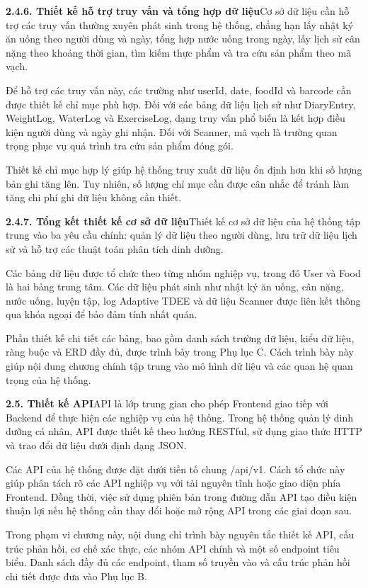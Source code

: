 \textbf{2.4.6. Thiết kế hỗ trợ truy vấn và tổng hợp dữ liệu}Cơ sở dữ liệu cần hỗ trợ các truy vấn thường xuyên phát sinh trong hệ thống, chẳng hạn lấy nhật ký ăn uống theo người dùng và ngày, tổng hợp nước uống trong ngày, lấy lịch sử cân nặng theo khoảng thời gian, tìm kiếm thực phẩm và tra cứu sản phẩm theo mã vạch.

Để hỗ trợ các truy vấn này, các trường như userId, date, foodId và barcode cần được thiết kế chỉ mục phù hợp. Đối với các bảng dữ liệu lịch sử như DiaryEntry, WeightLog, WaterLog và ExerciseLog, dạng truy vấn phổ biến là kết hợp điều kiện người dùng và ngày ghi nhận. Đối với Scanner, mã vạch là trường quan trọng phục vụ quá trình tra cứu sản phẩm đóng gói.

Thiết kế chỉ mục hợp lý giúp hệ thống truy xuất dữ liệu ổn định hơn khi số lượng bản ghi tăng lên. Tuy nhiên, số lượng chỉ mục cần được cân nhắc để tránh làm tăng chi phí ghi dữ liệu không cần thiết.

\textbf{2.4.7. Tổng kết thiết kế cơ sở dữ liệu}Thiết kế cơ sở dữ liệu của hệ thống tập trung vào ba yêu cầu chính: quản lý dữ liệu theo người dùng, lưu trữ dữ liệu lịch sử và hỗ trợ các thuật toán phân tích dinh dưỡng.

Các bảng dữ liệu được tổ chức theo từng nhóm nghiệp vụ, trong đó User và Food là hai bảng trung tâm. Các dữ liệu phát sinh như nhật ký ăn uống, cân nặng, nước uống, luyện tập, log Adaptive TDEE và dữ liệu Scanner được liên kết thông qua khóa ngoại để bảo đảm tính nhất quán.

Phần thiết kế chi tiết các bảng, bao gồm danh sách trường dữ liệu, kiểu dữ liệu, ràng buộc và ERD đầy đủ, được trình bày trong Phụ lục C. Cách trình bày này giúp nội dung chương chính tập trung vào mô hình dữ liệu và các quan hệ quan trọng của hệ thống.

\textbf{2.5. Thiết kế API}API là lớp trung gian cho phép Frontend giao tiếp với Backend để thực hiện các nghiệp vụ của hệ thống. Trong hệ thống quản lý dinh dưỡng cá nhân, API được thiết kế theo hướng RESTful, sử dụng giao thức HTTP và trao đổi dữ liệu dưới định dạng JSON.

Các API của hệ thống được đặt dưới tiền tố chung /api/v1. Cách tổ chức này giúp phân tách rõ các API nghiệp vụ với tài nguyên tĩnh hoặc giao diện phía Frontend. Đồng thời, việc sử dụng phiên bản trong đường dẫn API tạo điều kiện thuận lợi nếu hệ thống cần thay đổi hoặc mở rộng API trong các giai đoạn sau.

Trong phạm vi chương này, nội dung chỉ trình bày nguyên tắc thiết kế API, cấu trúc phản hồi, cơ chế xác thực, các nhóm API chính và một số endpoint tiêu biểu. Danh sách đầy đủ các endpoint, tham số truyền vào và cấu trúc phản hồi chi tiết được đưa vào Phụ lục B.

